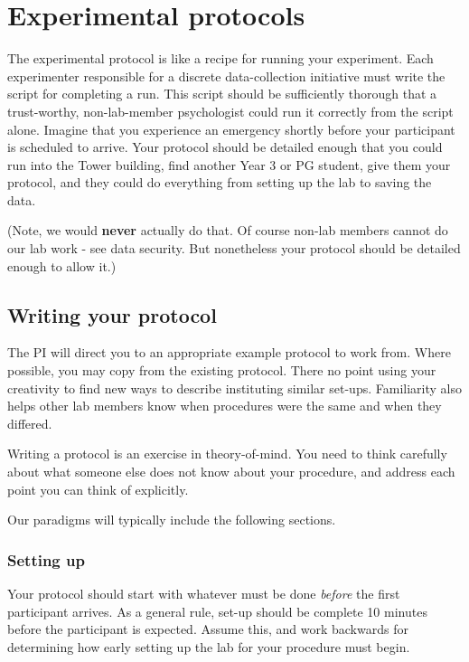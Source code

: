 \documentclass[
  12pt,
]{book}
\newcounter{none} %
\begin{document}
\chapter{Experimental protocols}\label{experimental-protocols}

The experimental protocol is like a recipe for running your experiment. Each experimenter responsible for a discrete data-collection initiative must write the script for completing a run. This script should be sufficiently thorough that a trust-worthy, non-lab-member psychologist could run it correctly from the script alone. Imagine that you experience an emergency shortly before your participant is scheduled to arrive. Your protocol should be detailed enough that you could run into the Tower building, find another Year 3 or PG student, give them your protocol, and they could do everything from setting up the lab to saving the data.

(Note, we would \textbf{never} actually do that. Of course non-lab members cannot do our lab work - see data security. But nonetheless your protocol should be detailed enough to allow it.)

\section{Writing your protocol}\label{writing-your-protocol}

The PI will direct you to an appropriate example protocol to work from. Where possible, you may copy from the existing protocol. There no point using your creativity to find new ways to describe instituting similar set-ups. Familiarity also helps other lab members know when procedures were the same and when they differed.

Writing a protocol is an exercise in theory-of-mind. You need to think carefully about what someone else does not know about your procedure, and address each point you can think of explicitly.

Our paradigms will typically include the following sections.

\subsection{Setting up}\label{setting-up}

Your protocol should start with whatever must be done \emph{before} the first participant arrives. As a general rule, set-up should be complete 10 minutes before the participant is expected. Assume this, and work backwards for determining how early setting up the lab for your procedure must begin.
\end{document}
